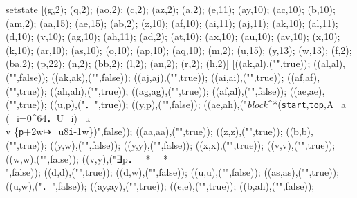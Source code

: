 setstate [(g,2); (q,2); (ao,2); (c,2); (az,2); (a,2); (e,11); (ay,10); (ac,10); (b,10); (am,2); (aa,15); (ae,15); (ab,2); (z,10); (af,10); (ai,11); (aj,11); (ak,10); (al,11); (d,10); (v,10); (ag,10); (ah,11); (ad,2); (at,10); (ax,10); (au,10); (av,10); (x,10); (k,10); (ar,10); (as,10); (o,10); (ap,10); (aq,10); (m,2); (u,15); (y,13); (w,13); (f,2); (ba,2); (p,22); (n,2); (bb,2); (l,2); (an,2); (r,2); (h,2)] [((ak,al),("",true)); ((al,al),("",false)); ((ak,ak),("",false)); ((aj,aj),("",true)); ((ai,ai),("",true)); ((af,af),("",true)); ((ah,ah),("",true)); ((ag,ag),("",true)); ((af,al),("",false)); ((ae,ae),("",true)); ((u,p),("．",true)); ((y,p),("",false)); ((ae,ah),("\emph{block}^*({\tt start},{\tt top},A_{\sf a} \uplus (\biguplus_{i=0}^{64}．U_i)_{\sf u} {}\\{} \uplus v \uplus \{{\tt p}+2{\sf w}↦_{\sf u}8{\tt i}-1{\sf w}\})",false)); ((aa,aa),("",true)); ((z,z),("",true)); ((b,b),("",true)); ((y,w),("",false)); ((y,y),("",false)); ((x,x),("",true)); ((v,v),("",true)); ((w,w),("",false)); ((v,y),("∃p．  *    *  {}\\{} ",false)); ((d,d),("",true)); ((d,w),("",false)); ((u,u),("\mrot{\iterstar{i∈[0\upto32)\uplusminus{\tt i}}．{}\\{} \smallbin{i}{U_i}}",false)); ((as,as),("",true)); ((u,w),("．",false)); ((ay,ay),("",true)); ((e,e),("",true)); ((b,ah),("",false)); 